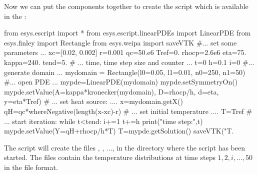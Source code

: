 Now we can put the components together to create the script 
which is available in the \ExampleDirectory{}:
\begin{python}
  from esys.escript import *
  from esys.escript.linearPDEs import LinearPDE
  from esys.finley import Rectangle
  from esys.weipa import saveVTK
  #... set some parameters ...
  xc=[0.02, 0.002]
  r=0.001
  qc=50.e6
  Tref=0.
  rhocp=2.6e6
  eta=75.
  kappa=240.
  tend=5.
  # ... time, time step size and counter ...
  t=0
  h=0.1
  i=0
  #... generate domain ...
  mydomain = Rectangle(l0=0.05, l1=0.01, n0=250, n1=50)
  #... open PDE ...
  mypde=LinearPDE(mydomain)
  mypde.setSymmetryOn()
  mypde.setValue(A=kappa*kronecker(mydomain), D=rhocp/h, d=eta, y=eta*Tref)
  # ... set heat source: ....
  x=mydomain.getX()
  qH=qc*whereNegative(length(x-xc)-r)
  # ... set initial temperature ....
  T=Tref
  # ... start iteration:
  while t<tend:
        i+=1
        t+=h
        print("time step:",t)
        mypde.setValue(Y=qH+rhocp/h*T)
        T=mypde.getSolution()
        saveVTK("T.%
\end{python}
The script will create the files , , $\ldots$,
 in the directory where the script has been started.
The files contain the temperature distributions at time steps $1, 2, i,
\ldots, 50$ in the \VTK file format.

